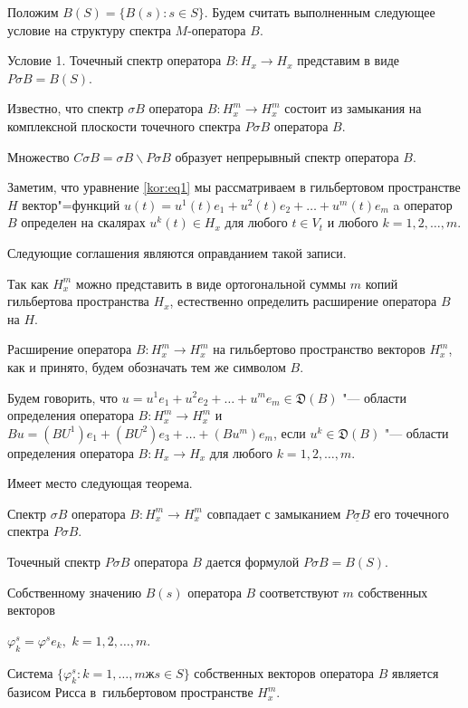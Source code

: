 \smallskip



Положим $B(S)=\{B(s):s\in S\}$. Будем считать выполненным следующее условие на структуру спектра $M$-оператора $B$.



\smallskip



{\small\sc Условие 1.} Точечный спектр оператора $B:H_x\to H_x$ представим в виде $P\sigma B=B(S)$.



\smallskip



Известно, что спектр $\sigma B$ оператора $B:H_x^m\to H_x^m$ состоит из замыкания на комплексной плоскости точечного спектра $P\sigma B$ оператора $B$. 

Множество $C\sigma B=\sigma B\backslash P\sigma B$ образует непрерывный спектр оператора $B$.



Заметим, что уравнение \eqref{kor:eq1} мы рассматриваем в гильбертовом пространстве $H$ вектор"=функций $u(t)=u^1(t)e_1+ u^2(t)e_2+\dots+u^m(t)e_m$ a оператор $B$ определен на скалярах $u^k(t)\in H_x$ для любого $t\in V_t$ и любого $k=1, 2, \dots,m$. 

Следующие соглашения являются оправданием такой записи. 

Так как $H_x^m$ можно представить в виде ортогональной суммы $m$ копий гильбертова пространства $H_x$, естественно определить расширение оператора $B$ на $H$. 

Расширение оператора $B:H_x^m\to H_x^m$ на гильбертово пространство векторов $H_x^m$, как и принято, будем обозначать тем же символом $B$. 

Будем говорить, что $u=u^1e_1+ u^2e_2+\dots+u^me_m\in\mathfrak{D}(B)$ "--- области определения оператора $B:H_x^m\to H_x^m$ и $Bu=(BU^1)e_1+ (BU^2)e_3+\dots+(Bu^m)e_m$, если $u^k\in\mathfrak{D}(B)$ "--- области определения оператора $B:H_x\to H_x$ для любого $k=1, 2, \dots,m$. 

Имеет место следующая теорема.



\smallskip



\hypertarget{korn:th:1}{}



\begin{theorem}[1]Спектр $\sigma B$ оператора $B:H_x^m\to H_x^m$ совпадает с замыканием $\underline{P\sigma B}$ его точечного спектра $P\sigma B.$ 

Точечный спектр $P\sigma B$ оператора $B$ дается формулой $P\sigma B=B(S).$ 

Собственному значению $B(s)$ оператора $B$ соответствуют $m$ собственных векторов 

$\varphi_k^s=\varphi^se_k,$ $k=1, 2,\dots,m.$ 

Система $\{\varphi_k^s:k=1,\dots,mж s\in S\}$ собственных векторов оператора $B$ является базисом Рисса в~гильбертовом пространстве $H_x^m.$

\end{theorem}



